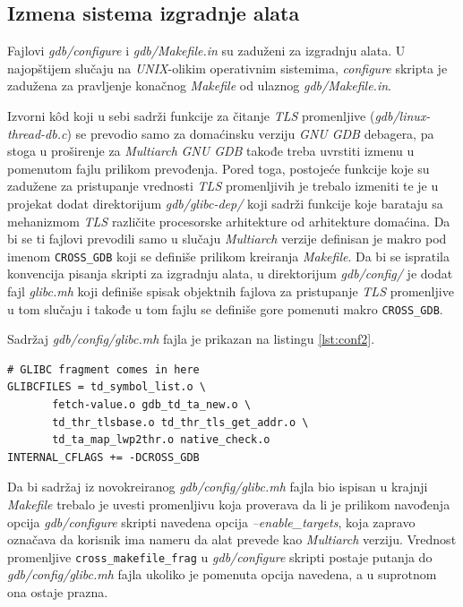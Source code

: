 \documentclass[12pt,oneside]{memoir}
\begin{document}
\subsection{Izmena sistema izgradnje alata}

Fajlovi \emph{gdb/configure} i \emph{gdb/Makefile.in} su zaduženi za izgradnju alata. U najopštijem slučaju na \emph{UNIX}-olikim operativnim sistemima, \emph{configure} skripta je zadužena za pravljenje konačnog \emph{Makefile} od ulaznog \emph{gdb/Makefile.in}.

Izvorni k\^{o}d koji u sebi sadrži funkcije za čitanje \emph{TLS} promenljive (\emph{gdb/linux-thread-db.c}) se prevodio samo za domaćinsku verziju \emph{GNU GDB} debagera, pa stoga u proširenje za \emph{Multiarch} \emph{GNU GDB} takođe treba uvrstiti izmenu u pomenutom fajlu prilikom prevođenja. Pored toga, postojeće funkcije koje su zadužene za pristupanje vrednosti \emph{TLS} promenljivih je trebalo izmeniti te je u projekat dodat direktorijum \emph{gdb/glibc-dep/} koji sadrži funkcije koje barataju sa mehanizmom \emph{TLS} različite procesorske arhitekture od arhitekture domaćina. Da bi se ti fajlovi prevodili samo u slučaju \emph{Multiarch} verzije definisan je makro pod imenom \texttt{CROSS\_GDB} koji se definiše prilikom kreiranja \emph{Makefile}. Da bi se ispratila konvencija pisanja skripti za izgradnju alata, u direktorijum \emph{gdb/config/} je dodat fajl \emph{glibc.mh} koji definiše spisak objektnih fajlova za pristupanje \emph{TLS} promenljive u tom slučaju i takođe u tom fajlu se definiše gore pomenuti makro \texttt{CROSS\_GDB}.

Sadržaj \emph{gdb/config/glibc.mh} fajla je prikazan na listingu \ref{lst:conf2}.
\begin{lstlisting}[label={lst:conf2}, caption={Sadržaj \emph{gdb/config/glibc.mh} fajla}]
# GLIBC fragment comes in here
GLIBCFILES = td_symbol_list.o \
       fetch-value.o gdb_td_ta_new.o \
       td_thr_tlsbase.o td_thr_tls_get_addr.o \
       td_ta_map_lwp2thr.o native_check.o
INTERNAL_CFLAGS += -DCROSS_GDB
\end{lstlisting}

Da bi sadržaj iz novokreiranog \emph{gdb/config/glibc.mh} fajla bio ispisan u krajnji \emph{Makefile} trebalo je uvesti promenljivu koja proverava da li je prilikom navođenja opcija \emph{gdb/configure} skripti navedena opcija \emph{--enable\_targets}, koja zapravo označava da korisnik ima nameru da alat prevede kao \emph{Multiarch} verziju. Vrednost promenljive \texttt{cross\_makefile\_frag} u \emph{gdb/configure} skripti postaje putanja do \emph{gdb/config/glibc.mh} fajla ukoliko je pomenuta opcija navedena, a u suprotnom ona ostaje prazna.
\end{document}
